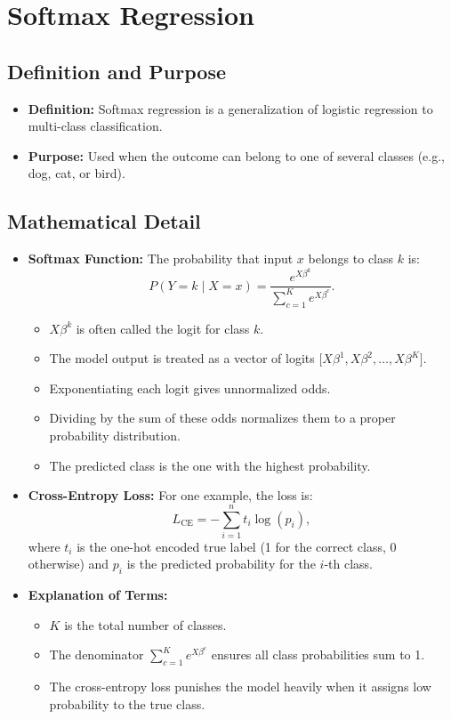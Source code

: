 \documentclass[10pt]{article}
\begin{document}
\pagebreak

\section{Softmax Regression}

\subsection{Definition and Purpose}
\begin{itemize}
    \item \textbf{Definition:} Softmax regression is a generalization of logistic regression to multi-class classification. 
    \item \textbf{Purpose:} Used when the outcome can belong to one of several classes (e.g., dog, cat, or bird).
\end{itemize}

\subsection{Mathematical Detail}
\begin{itemize}
    \item \textbf{Softmax Function:} The probability that input \( x \) belongs to class \( k \) is:
    \[
    P(Y=k\mid X=x)=\frac{e^{X\beta^{k}}}{\sum_{c=1}^{K} e^{X\beta^{c}}}.
    \]
    \begin{itemize}
        \item \(X\beta^{k}\) is often called the logit for class \(k\).
        \item The model output is treated as a vector of logits \(\bigl[X\beta^1, X\beta^2, \ldots, X\beta^K\bigr]\).
        \item Exponentiating each logit gives unnormalized odds.
        \item Dividing by the sum of these odds normalizes them to a proper probability distribution.
        \item The predicted class is the one with the highest probability.
    \end{itemize}
    \item \textbf{Cross-Entropy Loss:} For one example, the loss is:
    \[
    L_{\mathrm{CE}}=-\sum_{i=1}^{n} t_i \log(p_i),
    \]
    where \( t_i \) is the one-hot encoded true label (1 for the correct class, 0 otherwise) and \( p_i \) is the predicted probability for the \(i\)-th class.
    \item \textbf{Explanation of Terms:}
    \begin{itemize}
        \item \(K\) is the total number of classes.
        \item The denominator \(\sum_{c=1}^K e^{X \beta^c}\) ensures all class probabilities sum to 1.
        \item The cross-entropy loss punishes the model heavily when it assigns low probability to the true class.
    \end{itemize}
\end{itemize}
\end{document}
